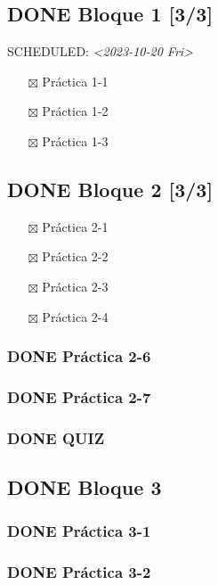 \documentclass[11pt]{article}
\begin{document}
\subsection{{\bfseries\sffamily DONE} Bloque 1 [3/3]}
\label{sec:orgea7fa97}
SCHEDULED: \textit{<2023-10-20 Fri>}
\begin{itemize}
\item[{$\boxtimes$}] Práctica 1-1
\item[{$\boxtimes$}] Práctica 1-2
\item[{$\boxtimes$}] Práctica 1-3
\end{itemize}
\subsection{{\bfseries\sffamily DONE} Bloque 2 [3/3]}
\label{sec:org79a87db}
\begin{itemize}
\item[{$\boxtimes$}] Práctica 2-1
\item[{$\boxtimes$}] Práctica 2-2
\item[{$\boxtimes$}] Práctica 2-3
\item[{$\boxtimes$}] Práctica 2-4
\end{itemize}
\subsubsection{{\bfseries\sffamily DONE} Práctica 2-6}
\label{sec:org8a94d33}
\subsubsection{{\bfseries\sffamily DONE} Práctica 2-7}
\label{sec:org700ce95}
\subsubsection{{\bfseries\sffamily DONE} QUIZ}
\label{sec:org258b02a}
\subsection{{\bfseries\sffamily DONE} Bloque 3}
\label{sec:org2ddc4ff}
\subsubsection{{\bfseries\sffamily DONE} Práctica 3-1}
\label{sec:orgfadcf0d}
\subsubsection{{\bfseries\sffamily DONE} Práctica 3-2}
\label{sec:orgb2cfad2}
\end{document}
